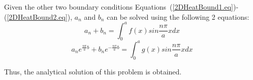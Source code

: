 Given the other two boundary conditions Equations~(\ref{2DHeatBound1.eq})-(\ref{2DHeatBound2.eq}), $a_n$ and $b_n$ can be solved using the following 2 equations:
\begin{equation}
a_n+b_n=\int_{0}^{a}f(x)sin\frac{n\pi}{a}xdx
\end{equation}
\begin{equation}
a_ne^{\frac{n\pi}{a}b}+b_ne^{-\frac{n\pi}{a}b}=\int_{0}^{a}g(x)sin\frac{n\pi}{a}xdx
\end{equation}

Thus, the analytical solution of this problem is obtained.















